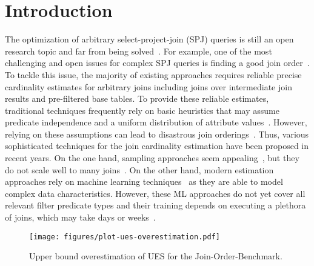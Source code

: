 \section{Introduction}
\label{sec:Introduction}

The optimization of arbitrary select-project-join (SPJ) queries is still an open research topic and far from being solved~\cite{DBLP:journals/pvldb/LeisGMBK015}.
For example, one of the most challenging and open issues for complex SPJ queries is finding a good join order~\cite{DBLP:conf/sigmod/CaiBS19,hertzschuch-21-ues,DBLP:journals/pvldb/LeisGMBK015}.
To tackle this issue, the majority of existing approaches requires reliable precise cardinality estimates for arbitrary joins including joins over intermediate join results and pre-filtered base tables.
To provide these reliable estimates, traditional techniques frequently rely on basic heuristics that may assume predicate independence and a uniform distribution of attribute values~\cite{DBLP:journals/pvldb/LeisGMBK015}. 
However, relying on these assumptions can lead to disastrous join orderings~\cite{DBLP:journals/pvldb/LeisGMBK015}. 
Thus, various sophisticated techniques for the join cardinality estimation have been proposed in recent years.
On the one hand, sampling approaches seem appealing~\cite{DBLP:conf/cidr/LeisRGK017,DBLP:conf/cidr/MoerkotteH20,DBLP:conf/sigmod/ZhaoC0HY18}, but they do not scale well to many joins~\cite{DBLP:conf/sigmod/ChenY17,DBLP:conf/sigmod/ZhaoC0HY18}. 
On the other hand, modern estimation approaches rely on machine learning techniques~\cite{DBLP:conf/cidr/KipfKRLBK19,DBLP:conf/sigmod/WoltmannHTHL19} as they are able to model complex data characteristics. 
However, these ML approaches do not yet cover all relevant filter predicate types and their training depends on executing a plethora of joins, which may take days or weeks~\cite{DBLP:conf/sigmod/WoltmannHHL20,DBLP:conf/btw/WoltmannHHL21}.

\begin{figure}[t]
    \centering
    \texttt{[image: figures/plot-ues-overestimation.pdf]}
    \caption{Upper bound overestimation of UES for the Join-Order-Benchmark.}
    \label{fig:UESOverestimationJOB}
    \vspace{-0.4cm}
\end{figure}

